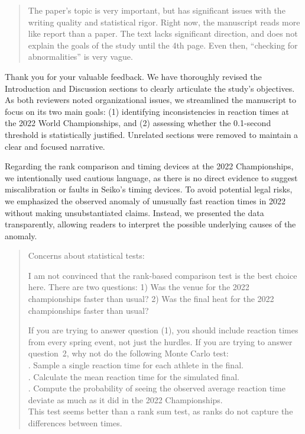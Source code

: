 \documentclass[12pt]{article}
\newenvironment{comment}%
{\begin{quotation}\noindent\small\it\color{darkblue}\ignorespaces%
}{\end{quotation}}
\begin{document}
\begin{comment}
The paper’s topic is very important, but has significant issues with the writing
quality and statistical rigor. Right now, the manuscript reads more like report
than a paper. The text lacks significant direction, and does not explain the
goals of the study until the 4th page. Even then, “checking for abnormalities”
is very vague.
\end{comment}


Thank you for your valuable feedback. We have thoroughly revised the
Introduction and Discussion sections to clearly articulate the study's
objectives. As both reviewers noted organizational issues, we
streamlined the manuscript to focus on its two main goals: (1)
identifying inconsistencies in reaction times at the 2022 World
Championships, and (2) assessing whether the 0.1-second threshold is
statistically justified. Unrelated sections were removed to maintain a
clear and focused narrative.


Regarding the rank comparison and timing devices at the 2022
Championships, we intentionally used cautious language, as there is no
direct evidence to suggest miscalibration or faults in Seiko’s timing
devices. To avoid potential legal risks, we emphasized the observed
anomaly of unusually fast reaction times in 2022 without making
unsubstantiated claims. Instead, we presented the data transparently,
allowing readers to interpret the possible underlying causes of the
anomaly.


\begin{comment}
Concerns about statistical tests:

I am not convinced that the rank-based comparison test is the best choice here.
There are two questions: 1) Was the venue for the 2022 championships faster than
usual? 2) Was the final heat for the 2022 championships faster than usual?

If you are trying to answer question (1), you should include reaction times from
every spring event, not just the hurdles. If you are trying to answer
question~2, why not do the following Monte Carlo test:\\
. Sample a single reaction time for each athlete in the final.\\
. Calculate the mean reaction time for the simulated final.\\
. Compute the probability of seeing the observed average reaction time deviate
as much as it did in the 2022 Championships.\\

This test seems better than a rank sum test, as ranks do not capture the
differences between times.
\end{comment}
\end{document}
